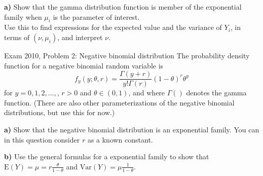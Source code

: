 \documentclass[
  ignorenonframetext,
]{beamer}
\begin{document}
\begin{frame}
\textbf{a)} Show that the gamma distribution function is member of the
exponential family when \(\mu_i\) is the parameter of interest.\\
Use this to find expressions for the expected value and the variance of
\(Y_i\), in terms of \((\nu,\mu_i)\), and interpret \(\nu\).
\end{frame}

\begin{frame}
\begin{block}{Exam 2010, Problem 2: Negative binomial distribution}
\protect\hypertarget{exam-2010-problem-2-negative-binomial-distribution}{}
The probability density function for a negative binomial random variable
is
\[f_y(y; \theta, r) = \frac{\Gamma(y + r)}{y! \Gamma(r)} (1-\theta)^r \theta^y\]
for \(y = 0,1,2,\ldots,\), \(r>0\) and \(\theta \in (0,1)\), and where
\(\Gamma()\) denotes the gamma function. (There are also other
parameterizations of the negative binomial distributions, but use this
for now.)
\end{block}
\end{frame}

\begin{frame}
\textbf{a)} Show that the negative binomial distribution is an
exponential family. You can in this question consider \(r\) as a known
constant.

\textbf{b)} Use the general formulas for a exponential family to show
that \(\text{E}(Y)=\mu=r\frac{\theta}{1-\theta}\) and
\(\text{Var}(Y)=\mu \frac{1}{1-\theta}\).
\end{frame}
\end{document}
